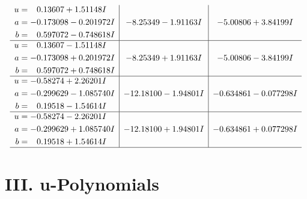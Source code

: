 \documentclass[1p]{elsarticle_modified}
\theoremstyle{definition}
\begin{document}
$$\begin{array}{c|c|c}
\begin{aligned}
u &= \phantom{-}0.13607 + 1.51148 I \\
a &= -0.173098 - 0.201972 I \\
b &= \phantom{-}0.597072 - 0.748618 I\end{aligned}
 & -8.25349 - 1.91163 I & -5.00806 + 3.84199 I \\ \hline\begin{aligned}
u &= \phantom{-}0.13607 - 1.51148 I \\
a &= -0.173098 + 0.201972 I \\
b &= \phantom{-}0.597072 + 0.748618 I\end{aligned}
 & -8.25349 + 1.91163 I & -5.00806 - 3.84199 I \\ \hline\begin{aligned}
u &= -0.58274 + 2.26201 I \\
a &= -0.299629 - 1.085740 I \\
b &= \phantom{-}0.19518 - 1.54614 I\end{aligned}
 & -12.18100 - 1.94801 I & -0.634861 - 0.077298 I \\ \hline\begin{aligned}
u &= -0.58274 - 2.26201 I \\
a &= -0.299629 + 1.085740 I \\
b &= \phantom{-}0.19518 + 1.54614 I\end{aligned}
 & -12.18100 + 1.94801 I & -0.634861 + 0.077298 I\\
 \hline 
 \end{array}$$\newpage
\newpage\renewcommand{\arraystretch}{1}
\centering \section*{ III. u-Polynomials}
\end{document}
